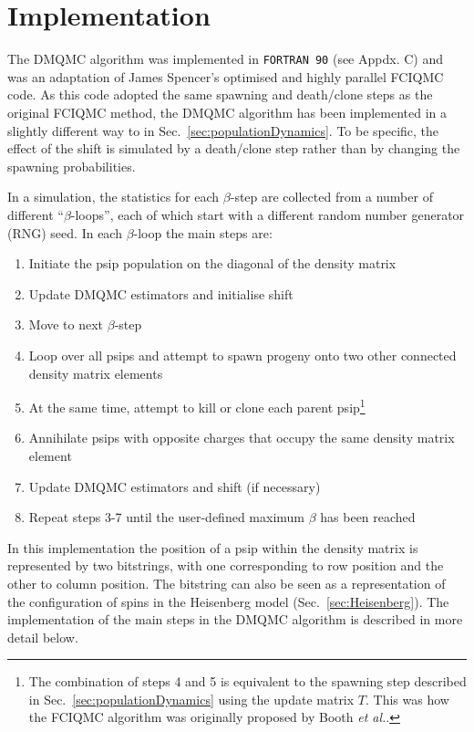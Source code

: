 \section{Implementation}
\label{sec:implementation}
The DMQMC algorithm was implemented in \texttt{FORTRAN 90} (see Appdx. C) and was an adaptation of James Spencer's optimised and highly parallel FCIQMC code. As this code adopted the same spawning and death/clone steps as the original FCIQMC method\cite{Booth2009}, the DMQMC algorithm has been implemented in a slightly different way to in Sec.~\ref{sec:populationDynamics}. To be specific, the effect of the shift is simulated by a death/clone step rather than by changing the spawning probabilities.

In a simulation, the statistics for each $\beta$-step are collected from a number of different ``$\beta$-loops'', each of which start with a different random number generator (RNG) seed. In each $\beta$-loop the main steps are:
\begin{enumerate}
\item Initiate the psip population on the diagonal of the density matrix
\item Update DMQMC estimators and initialise shift
\item Move to next $\beta$-step
\item Loop over all psips and attempt to spawn progeny onto two other connected density matrix elements
\item At the same time, attempt to kill or clone each parent psip\footnote{The combination of steps 4 and 5 is equivalent to the spawning step described in Sec.~\ref{sec:populationDynamics} using the update matrix $T$. This was how the FCIQMC algorithm was originally proposed by Booth \textit{et al.}\cite{Booth2009}.}
\item Annihilate psips with opposite charges that occupy the same density matrix element
\item Update DMQMC estimators and shift (if necessary)
\item Repeat steps 3-7 until the user-defined maximum $\beta$ has been reached
\end{enumerate}

In this implementation the position of a psip within the density matrix is represented by two bitstrings, with one corresponding to row position and the other to column position.  The bitstring can also be seen as a representation of the configuration of spins in the Heisenberg model (Sec.~\ref{sec:Heisenberg}). The implementation of the main steps in the DMQMC algorithm is described in more detail below.

